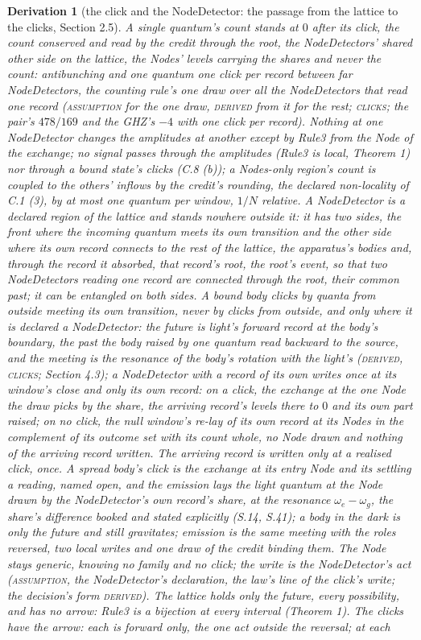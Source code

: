 \documentclass[pdflatex,sn-mathphys-num]{sn-jnl}
\newcommand{\claimmark}[1]{\textup{\textsc{#1}}}
\newcommand{\fence}[1]{\textup{\textsc{#1}}}
\theoremstyle{thmstyleone}
\newtheorem{derivation}{Derivation}
\begin{document}
\begin{derivation}[the click and the NodeDetector: the passage from the lattice to the clicks, Section 2.5]
A single quantum's count stands at $0$ after its click, the count conserved and read by the credit through the root, the NodeDetectors' shared other side on the lattice, the Nodes' levels carrying the shares and never the count: antibunching and one quantum one click per record between far NodeDetectors, the counting rule's one draw over all the NodeDetectors that read one record (\claimmark{assumption} for the one draw, \claimmark{derived} from it for the rest; \fence{clicks}; the pair's $478 / 169$ and the GHZ's $-4$ with one click per record). Nothing at one NodeDetector changes the amplitudes at another except by Rule3 from the Node of the exchange; no signal passes through the amplitudes (Rule3 is local, Theorem 1) nor through a bound state's clicks (C.8 (b)); a Nodes-only region's count is coupled to the others' inflows by the credit's rounding, the declared non-locality of C.1 (3), by at most one quantum per window, $1 / N$ relative. A NodeDetector is a declared region of the lattice and stands nowhere outside it: it has two sides, the front where the incoming quantum meets its own transition and the other side where its own record connects to the rest of the lattice, the apparatus's bodies and, through the record it absorbed, that record's root, the root's event, so that two NodeDetectors reading one record are connected through the root, their common past; it can be entangled on both sides. A bound body clicks by quanta from outside meeting its own transition, never by clicks from outside, and only where it is declared a NodeDetector: the future is light's forward record at the body's boundary, the past the body raised by one quantum read backward to the source, and the meeting is the resonance of the body's rotation with the light's (\claimmark{derived}, \fence{clicks}; Section 4.3); a NodeDetector with a record of its own writes once at its window's close and only its own record: on a click, the exchange at the one Node the draw picks by the share, the arriving record's levels there to $0$ and its own part raised; on no click, the null window's re-lay of its own record at its Nodes in the complement of its outcome set with its count whole, no Node drawn and nothing of the arriving record written. The arriving record is written only at a realised click, once. A spread body's click is the exchange at its entry Node and its settling a reading, named open, and the emission lays the light quantum at the Node drawn by the NodeDetector's own record's share, at the resonance $\omega_e - \omega_g$, the share's difference booked and stated explicitly (S.14, S.41); a body in the dark is only the future and still gravitates; emission is the same meeting with the roles reversed, two local writes and one draw of the credit binding them. The Node stays generic, knowing no family and no click; the write is the NodeDetector's act (\claimmark{assumption}, the NodeDetector's declaration, the law's line of the click's write; the decision's form \claimmark{derived}). The lattice holds only the future, every possibility, and has no arrow: Rule3 is a bijection at every interval (Theorem 1). The clicks have the arrow: each is forward only, the one act outside the reversal; at each 
\end{derivation}
\end{document}
